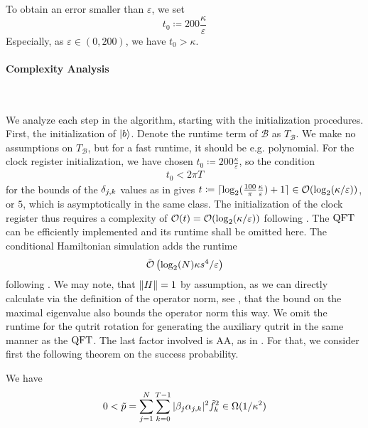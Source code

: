 \begin{corollary}[Choosing \(t_0\)]
    To obtain an error smaller than \(\varepsilon\), we set
    \[
        t_0 \coloneqq 200 \frac{\kappa}{\varepsilon}
    \]
    Especially, as \(\varepsilon \in (0, 200)\), we have \(t_0 > \kappa\).
\end{corollary}

\paragraph*{Complexity Analysis} \phantom{}\\\phantom{}

We analyze each step in the algorithm, starting with the initialization procedures. First, the initialization of \(\ket{b}\). Denote the runtime term of \(\mathcal{B}\) as \(T_{\mathcal{B}}\). We make no assumptions on \(T_{\mathcal{B}}\), but for a fast runtime, it should be e.g. polynomial. For the clock register initialization, we have chosen \(t_0 \coloneqq 200 \frac{\kappa}{\varepsilon}\), so the condition
\begin{align}
    t_0 < 2 \pi T
\end{align}
for the bounds of the \(\delta_{j, k}\) values as in  gives \(t \coloneqq \lceil \log_2(\frac{100}{\pi}\frac{\kappa}{\varepsilon}) + 1 \rceil \in \operatorname{\mathcal{O}}(\log_2(\kappa/\varepsilon))\), or \(5\), which is asymptotically in the same class. The initialization of the clock register thus requires a complexity of \(\operatorname{\mathcal{O}}(t) = \operatorname{\mathcal{O}}(\log_2(\kappa/\varepsilon))\) following . The \(\operatorname{QFT}\) can be efficiently implemented and its runtime shall be omitted here. The conditional Hamiltonian simulation adds the runtime
\begin{align}
    \tilde{\operatorname{\mathcal{O}}}\left(\log_2(N) \kappa s^4/\varepsilon\right)
\end{align}
following . We may note, that \(\norm{H} = 1\) by assumption, as we can directly calculate via the definition of the operator norm, see , that the bound on the maximal eigenvalue also bounds the operator norm this way. We omit the runtime for the qutrit rotation for generating the auxiliary qutrit in the same manner as the \(\operatorname{QFT}\). The last factor involved is AA, as in . For that, we consider first the following theorem on the success probability.
\begin{theorem}
    We have
    \begin{align}
        0 < \tilde{p} = \sum_{j=1}^N\sum_{k=0}^{T-1} |\beta_j\alpha_{j, k}|^2 \tilde{f}_k^2 \in \Omega(1/\kappa^2)
    \end{align}
\end{theorem}

